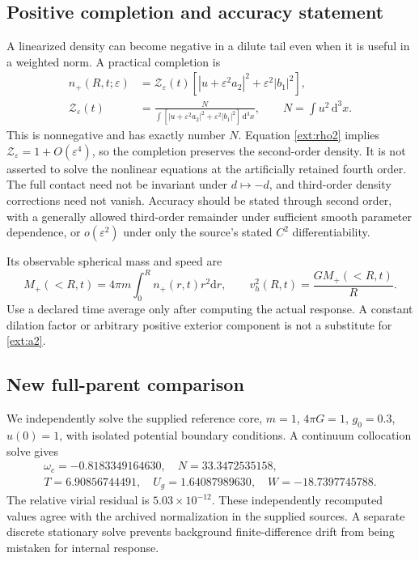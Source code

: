 \documentclass[11pt]{article}
\newcommand{\dd}{\mathrm d}
\begin{document}
\subsection{Positive completion and accuracy statement}
A linearized density can become negative in a dilute tail even when it is useful in a weighted norm. A practical completion is
\begin{align}
 n_+(R,t;\varepsilon)&=\mathcal Z_\varepsilon(t)
       \left[|u+\varepsilon^2a_2|^2+\varepsilon^2|b_1|^2\right],\\
 \mathcal Z_\varepsilon(t)&=
 \frac{N}{\displaystyle\int[|u+\varepsilon^2a_2|^2+\varepsilon^2|b_1|^2]\,\dd^3x},
 \qquad N=\int u^2\,\dd^3x.\label{ext:positive}
\end{align}
This is nonnegative and has exactly number $N$. Equation \eqref{ext:rho2} implies $\mathcal Z_\varepsilon=1+O(\varepsilon^4)$, so the completion preserves the second-order density. It is not asserted to solve the nonlinear equations at the artificially retained fourth order. The full contact need not be invariant under $d\mapsto-d$, and third-order density corrections need not vanish. Accuracy should be stated through second order, with a generally allowed third-order remainder under sufficient smooth parameter dependence, or $o(\varepsilon^2)$ under only the source's stated $C^2$ differentiability.

Its observable spherical mass and speed are
\begin{equation}
 M_+(<R,t)=4\pi m\int_0^R n_+(r,t)r^2\dd r,
 \qquad v_h^2(R,t)=\frac{GM_+(<R,t)}{R}.
 \label{ext:envforward}
\end{equation}
Use a declared time average only after computing the actual response. A constant dilation factor or arbitrary positive exterior component is not a substitute for \eqref{ext:a2}.

\subsection{New full-parent comparison}
We independently solve the supplied reference core, $m=1$, $4\pi G=1$, $g_0=0.3$, $u(0)=1$, with isolated potential boundary conditions. A continuum collocation solve gives
\begin{equation}
 \begin{gathered}
 \omega_c=-0.8183349164630,\quad N=33.3472535158,\\
 T=6.90856744491,\quad U_g=1.64087989630,\quad W=-18.7397745788.
 \end{gathered}
\end{equation}
The relative virial residual is $5.03\times10^{-12}$. These independently recomputed values agree with the archived normalization in the supplied sources. A separate discrete stationary solve prevents background finite-difference drift from being mistaken for internal response.
\end{document}
